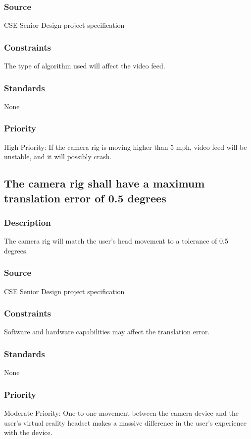 \subsubsection{Source}
CSE Senior Design project specification
\subsubsection{Constraints}
The type of algorithm used will affect the video feed.
\subsubsection{Standards}
None
\subsubsection{Priority}
High Priority: If the camera rig is moving higher than 5 mph, video feed will be unstable, and it will possibly crash.

\subsection{The camera rig shall have a maximum translation error of 0.5 degrees}
\subsubsection{Description}
The camera rig will match the user's head movement to a tolerance of 0.5 degrees.
\subsubsection{Source}
CSE Senior Design project specification
\subsubsection{Constraints}
Software and hardware capabilities may affect the translation error.
\subsubsection{Standards}
None
\subsubsection{Priority}
Moderate Priority: One-to-one movement between the camera device and the user's virtual reality headset makes a massive difference in the user's experience with the device.
